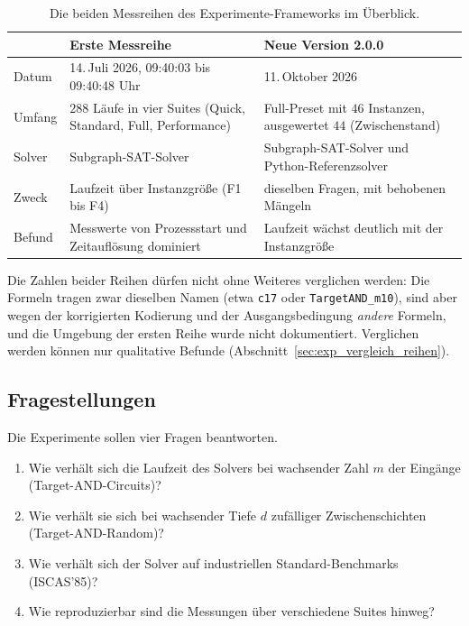 \begin{table}[!ht]
	\centering
	\small
	\begin{tabularx}{\textwidth}{@{}L{3.3cm}YY@{}}
		\toprule
		& Erste Messreihe & Neue Version 2.0.0 \\
		\midrule
		Datum & 14.\,Juli 2026, 09:40:03 bis 09:40:48 Uhr & 11.\,Oktober 2026 \\
		Umfang & $288$ Läufe in vier Suites (Quick, Standard, Full, Performance) & Full-Preset mit $46$ Instanzen, ausgewertet $44$ (Zwischenstand) \\
		Solver & Subgraph-SAT-Solver & Subgraph-SAT-Solver und Python-Referenzsolver \\
		Zweck & Laufzeit über Instanzgröße (F1 bis F4) & dieselben Fragen, mit behobenen Mängeln \\
		Befund & Messwerte von Prozessstart und Zeitauflösung dominiert & Laufzeit wächst deutlich mit der Instanzgröße \\
		\bottomrule
	\end{tabularx}
	\caption{Die beiden Messreihen des Experimente-Frameworks im Überblick.}
	\label{tab:exp_reihen}
\end{table}

Die Zahlen beider Reihen dürfen nicht ohne Weiteres verglichen werden: Die Formeln tragen zwar dieselben Namen (etwa \texttt{c17} oder \texttt{TargetAND\_m10}), sind aber wegen der korrigierten Kodierung und der Ausgangsbedingung \emph{andere} Formeln, und die Umgebung der ersten Reihe wurde nicht dokumentiert. Verglichen werden können nur qualitative Befunde (Abschnitt~\ref{sec:exp_vergleich_reihen}).

\subsection{Fragestellungen}

Die Experimente sollen vier Fragen beantworten.

\begin{enumerate}[label=\textbf{F\arabic*}]
	\item Wie verhält sich die Laufzeit des Solvers bei wachsender Zahl $m$ der Eingänge (Target-AND-Circuits)?
	\item Wie verhält sie sich bei wachsender Tiefe $d$ zufälliger Zwischenschichten (Target-AND-Random)?
	\item Wie verhält sich der Solver auf industriellen Standard-Benchmarks (ISCAS'85)?
	\item Wie reproduzierbar sind die Messungen über verschiedene Suites hinweg?
\end{enumerate}

